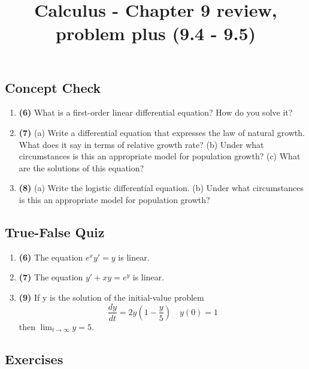 \documentclass[12pt, a4paper]{article}
\title{Calculus - Chapter 9 review, problem plus (9.4 - 9.5)}
\author{}
\date{}
\begin{document}
\maketitle
\hrulefill
\vspace{1em}

\subsection*{Concept Check}

\begin{enumerate}
    \item \textbf{(6)} What is a first-order linear differential equation? How do you solve it?

    \item \textbf{(7)} (a) Write a differential equation that expresses the law of natural growth. What does it say in terms of relative growth rate?
    (b) Under what circumstances is this an appropriate model for population growth?
    (c) What are the solutions of this equation?

    \item \textbf{(8)} (a) Write the logistic differential equation.
    (b) Under what circumstances is this an appropriate model for population growth?
\end{enumerate}

\hrulefill
\vspace{1em}

\subsection*{True-False Quiz}

\begin{enumerate}
    \item \textbf{(6)} The equation $e^x y' = y$ is linear.

    \item \textbf{(7)} The equation $y' + xy = e^y$ is linear.

    \item \textbf{(9)} If y is the solution of the initial-value problem
    \[ \frac{dy}{dt} = 2y\left(1 - \frac{y}{5}\right) \quad y(0) = 1 \]
    then $\lim_{t\to\infty} y = 5$.
\end{enumerate}

\hrulefill
\vspace{1em}

\subsection*{Exercises}
\end{document}
